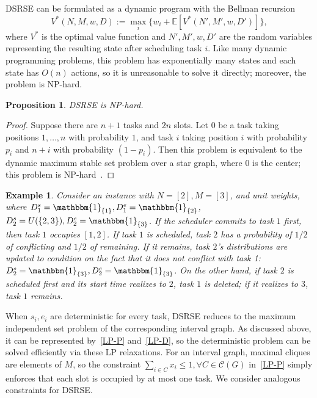 \documentclass{article}
\newtheorem{example}[theorem]{Example}
\newtheorem{proposition}[theorem]{Proposition}
\newcommand{\E}{\mathbb{E}}
\begin{document}
DSRSE can be formulated as a dynamic program with the Bellman recursion
\[
V^*(N,M,w,D):=\max_i\{w_i+\E[V^*(N',M',w,D')]\},
\]
where %
$V^*$ is the optimal value function and $N',M',w,D'$ are the random variables representing the resulting state after scheduling task $i$.
Like many dynamic programming problems, this problem has exponentially many states and each state has $O(n)$ actions, so it is unreasonable to solve it directly;
moreover, the problem is NP-hard.
\begin{proposition}
    DSRSE is NP-hard.
\end{proposition}
\begin{proof}
    Suppose there are $n+1$ tasks and $2n$ slots.
    Let $0$ be a task taking positions $1,\ldots,n$ with probability $1$, and task $i$ taking position $i$ with probability $p_i$ and $n+i$ with probability $(1-p_i)$.
    Then this problem is equivalent to the dynamic maximum stable set problem over a star graph, where $0$ is the center;
    this problem is NP-hard~\cite{DNP}.
\end{proof}
\begin{example}
\label{eg:1}
    Consider an instance with $N=[2],M=[3]$, and unit weights, where $D_1^s=\mathbbm{1}_{\{1\}},D_1^e=\mathbbm{1}_{\{2\}}$, $D_2^s=U(\{2,3\}),D_2^e=\mathbbm{1}_{\{3\}}$.
If the scheduler commits to task $1$ first, then task $1$ occupies $[1,2]$.
%
If task $1$ is scheduled, task $2$ has a probability of $1/2$ of conflicting and $1/2$ of remaining.
If it remains, task $2$'s distributions are updated to condition on the fact that it does not conflict with task 1: $D_2^s=\mathbbm{1}_{\{3\}},D_2^e=\mathbbm{1}_{\{3\}}$.
On the other hand, if task $2$ is scheduled first and its start time realizes to $2$, task $1$ is deleted; if it realizes to $3$, task $1$ remains.
\end{example}
When $s_i,e_i$ are deterministic for every task, DSRSE reduces to the maximum independent set problem of the corresponding interval graph.
As discussed above, it can be represented by~\eqref{LP-P} and~\eqref{LP-D}, so the deterministic problem can be solved efficiently via these LP relaxations.
For an interval graph, maximal cliques are elements of $M$, so the constraint $\sum_{i\in C}x_i\leq 1,\forall C\in\mathcal{C}(G)$ in~\eqref{LP-P} simply enforces that each slot is occupied by at most one task.
We consider analogous constraints for DSRSE.
\end{document}
